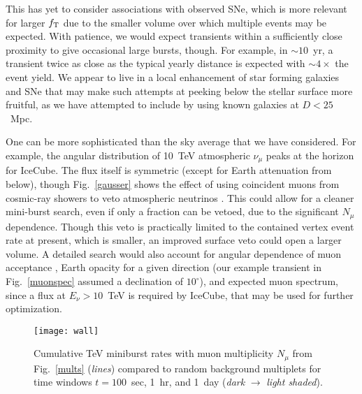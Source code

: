 \documentclass[aps,prd,nofootinbib,twocolumn,floatfix,letterpaper,superscriptaddress,showpacs]{revtex4}
\begin{document}
This has yet to consider associations with observed SNe, which is more relevant for larger $f_{\rm T}$ due to the smaller volume over which multiple events may be expected.
With patience, we would expect transients within a sufficiently close proximity to give occasional large bursts, though.  For example, in $\sim\! 10$~yr, a transient twice as close as the typical yearly distance is expected with $\sim\! 4\times$ the event yield.  We appear to live in a local enhancement of star forming galaxies \cite{Karachentsev:2004dx,Karachentsev:2013ipr} and SNe \cite{Ando2005b,Kistler2011} that may make such attempts at peeking below the stellar surface more fruitful, as we have attempted to include by using known galaxies at $D \!<\! 25$~Mpc.

One can be more sophisticated than the sky average that we have considered.  For example, the angular distribution of 10~TeV atmospheric $\nu_\mu$ peaks at the horizon for IceCube.  The flux itself is symmetric (except for Earth attenuation from below), though Fig.~\ref{gausser} shows the effect of using coincident muons from cosmic-ray showers to veto atmospheric neutrinos \cite{Schonert:2008is,Gaisser:2014bja}.  This could allow for a cleaner mini-burst search, even if only a fraction can be vetoed, due to the significant $N_\mu$ dependence.
Though this veto is practically limited to the contained vertex event rate at present, which is smaller, an improved surface veto could open a larger volume.
A detailed search would also account for angular dependence of muon acceptance \cite{Abbasi:2012wht}, Earth opacity for a given direction (our example transient in Fig.~\ref{muonspec} assumed a declination of $10^\circ$), and expected muon spectrum, since a flux at $E_\nu \!>\! 10$~TeV is required by IceCube, that may be used for further optimization.


\begin{figure}[t!]
\hspace*{-0.1cm}
\texttt{[image: wall]}
%
\vspace*{-0.5cm}
\caption{Cumulative TeV miniburst rates with muon multiplicity $N_\mu$ from Fig.~\ref{mults} ({\it lines}) compared to random background multiplets for time windows $t \!=\! 100$~sec, 1~hr, and 1~day ({\it dark} $\rightarrow$ {\it light shaded}).
\label{multstall}}
\end{figure}
\end{document}
